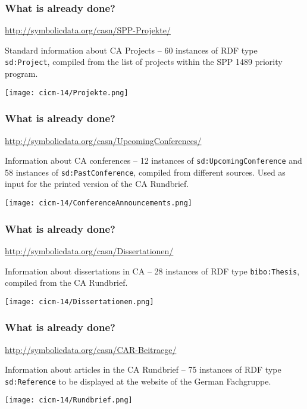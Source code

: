 \documentclass{beamer}
\begin{document}
\begin{frame}\frametitle{What is already done?}\small

  \begin{center}
    \url{http://symbolicdata.org/casn/SPP-Projekte/}
  \end{center}

Standard information about CA Projects -- 60 instances of RDF type
\texttt{sd:Project}, compiled from the list of projects within the SPP 1489
priority program.

\begin{center}
  \texttt{[image: cicm-14/Projekte.png]}
\end{center}
\end{frame}

\begin{frame}\frametitle{What is already done?}\small

  \begin{center}
    \url{http://symbolicdata.org/casn/UpcomingConferences/}
  \end{center}

Information about CA conferences -- 12 instances of
\texttt{sd:UpcomingConference} and 58 instances of
\texttt{sd:PastConference}, compiled from different sources.  Used as input
for the printed version of the CA Rundbrief.

\begin{center}
  \texttt{[image: cicm-14/ConferenceAnnouncements.png]}
\end{center}
\end{frame}

\begin{frame}\frametitle{What is already done?}\small

  \begin{center}
    \url{http://symbolicdata.org/casn/Dissertationen/}
  \end{center}

Information about dissertations in CA -- 28 instances of RDF type
\texttt{bibo:Thesis}, compiled from the CA Rundbrief.

\begin{center}
  \texttt{[image: cicm-14/Dissertationen.png]}
\end{center}
\end{frame}

\begin{frame}\frametitle{What is already done?}\small

  \begin{center}
    \url{http://symbolicdata.org/casn/CAR-Beitraege/}
  \end{center}

Information about articles in the CA Rundbrief -- 75 instances of RDF type
\texttt{sd:Reference} to be displayed at the website of the German Fachgruppe. 

\begin{center}
  \texttt{[image: cicm-14/Rundbrief.png]}
\end{center}
\end{frame}
\end{document}
